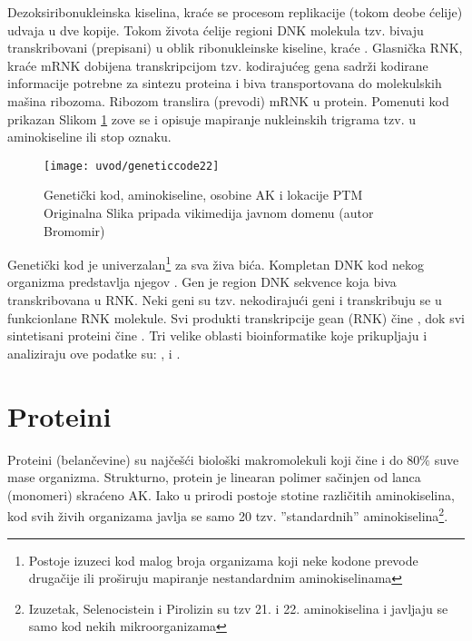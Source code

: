 Dezoksiribonukleinska kiselina, kraće  se procesom replikacije
(tokom deobe ćelije) udvaja u dve kopije. Tokom života ćelije regioni DNK
molekula tzv.  bivaju transkribovani (prepisani) u oblik
ribonukleinske kiseline, kraće .  Glasnička RNK, kraće mRNK
dobijena transkripcijom tzv. kodirajućeg gena sadrži kodirane informacije
potrebne za sintezu proteina i biva transportovana do molekulskih mašina
ribozoma. Ribozom translira (prevodi) mRNK u protein. Pomenuti kod prikazan
Slikom \ref{fig:kod} zove se  i opisuje mapiranje nukleinskih
trigrama tzv.   u aminokiseline ili stop oznaku.

\begin{figure}[]
\centering
\hspace*{-2.3cm} 
\texttt{[image: uvod/geneticcode22]}
\caption { Genetički kod, aminokiseline, osobine AK i lokacije PTM\\
  \footnotesize
Originalna Slika pripada vikimedija javnom domenu (autor Bromomir)}
\label{fig:kod}
\end{figure}

\clearpage

Genetički kod je univerzalan\footnote{Postoje izuzeci kod malog broja
organizama koji neke kodone prevode drugačije ili proširuju mapiranje
nestandardnim aminokiselinama} za sva živa bića.  Kompletan DNK kod nekog
organizma predstavlja njegov .  Gen je region DNK sekvence koja
biva transkribovana u RNK.  Neki geni su tzv. nekodirajući geni i transkribuju
se u funkcionlane RNK molekule.  Svi produkti transkripcije gean (RNK) čine
, dok svi sintetisani proteini čine .
Tri velike oblasti bioinformatike koje prikupljaju i analiziraju ove podatke
su: ,  i .


\label{sec:}
\section{Proteini}

Proteini (belančevine) su najčešći biološki makromolekuli koji čine i do $80\%$
suve mase organizma.  Strukturno, protein je linearan polimer sačinjen od lanca
(monomeri) skraćeno AK. Iako u prirodi postoje stotine
različitih aminokiselina, kod svih živih organizama javlja se samo 20 tzv.
''standardnih'' aminokiselina\footnote{Izuzetak, Selenocistein i Pirolizin su tzv 21. i
22. aminokiselina i javljaju se samo kod nekih mikroorganizama}.

